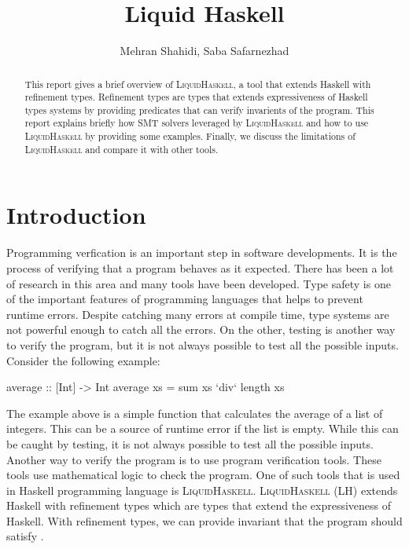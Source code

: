 \documentclass[]{rptuseminar}
\title{Liquid Haskell}
\author{Mehran Shahidi, Saba Safarnezhad
  \institute{Rheinland-Pfälzische Technische Universität Kaiserslautern-Landau, Department of Computer Science}}
\begin{document}

\maketitle


\begin{abstract}
  This report gives a brief overview of \textsc{LiquidHaskell}, a tool that extends Haskell with refinement types. 
  Refinement types are types that extends expressiveness of Haskell types systems by providing predicates that can verify
  invarients of the program. This report explains briefly how SMT solvers leveraged by \textsc{LiquidHaskell} and 
  how to use \textsc{LiquidHaskell} by providing some examples. Finally, we discuss the limitations of \textsc{LiquidHaskell} and compare it with other tools.
\end{abstract}


\section{Introduction}
\label{sec:introduction}
Programming verfication is an important step in software developments. It is the process of
verifying that a program behaves as it expected. There has been a lot of research in this 
area and many tools have been developed. 
Type safety is one of the important features of programming languages that helps to prevent runtime errors.
Despite catching many errors at compile time, type systems are not powerful enough to catch all the errors.
On the other, testing is another way to verify the program, but it is not always possible to test all the possible inputs.
Consider the following example:

\begin{haskell}
  average    :: [Int] -> Int
  average xs = sum xs `div` length xs
\end{haskell}

The example above is a simple function that calculates the average of a list of integers. This can be a source of runtime
error if the list is empty. While this can be caught by testing, it is not always possible to test all the possible inputs.
Another way to verify the program is to use program verification tools. These tools use mathematical logic to check the program.
One of such tools that is used in Haskell programming language is \textsc{LiquidHaskell}. \textsc{LiquidHaskell} 
(LH) extends Haskell with refinement types which are types that extend the expressiveness of Haskell.
With refinement types, we can provide invariant that the program should satisfy \cite{jhala_programming_2020}. 
\end{document}

